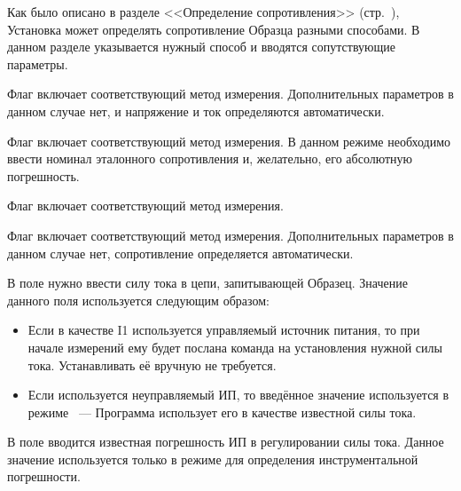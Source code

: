 \label{sec_r_measure_config}

Как было описано в разделе <<Определение сопротивления>> (стр.~\pageref{sec_r_measures}), Установка может определять сопротивление Образца разными способами. В данном разделе указывается нужный способ и вводятся сопутствующие параметры.

Флаг  включает соответствующий метод измерения. Дополнительных параметров в данном случае нет, и напряжение и ток определяются автоматически.

Флаг  включает соответствующий метод измерения. В данном режиме необходимо ввести номинал эталонного сопротивления и, желательно, его абсолютную погрешность.

Флаг  включает соответствующий метод измерения.

Флаг  включает соответствующий метод измерения. Дополнительных параметров в данном случае нет, сопротивление определяется автоматически.

В поле  нужно ввести силу тока в цепи, запитывающей Образец. Значение данного поля используется следующим образом:

\begin{itemize}
\item Если в качестве I1 используется управляемый источник питания, то при начале измерений ему будет послана команда на установления нужной силы тока. Устанавливать её вручную не требуется.
\item Если используется неуправляемый ИП, то введённое значение используется в режиме  ~--- Программа использует его в качестве известной силы тока.
\end{itemize}

В поле  вводится известная погрешность ИП в регулировании силы тока. Данное значение используется только в режиме  для определения инструментальной погрешности.

